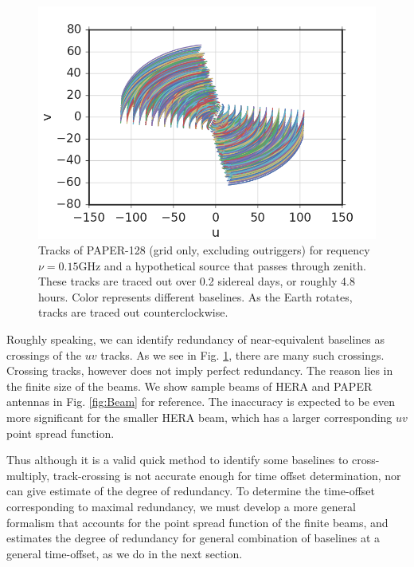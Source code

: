\documentclass[twocolumn,apj,numberedappendix]{emulateapj}
\renewcommand\[{\begin{equation}}
\renewcommand\]{\end{equation}}
\begin{document}
\begin{figure}[H]
\includegraphics[width=\linewidth]{tracks128}
\caption{Tracks of PAPER-128 (grid only, excluding outriggers) for requency $\nu=0.15\text{GHz}$ and a hypothetical source that passes through zenith.
These tracks are traced out over 0.2 sidereal days, or roughly 4.8
hours. Color represents different baselines. 
As the Earth rotates, tracks are traced out counterclockwise. }
\label{fig:Tracks}
\end{figure}

Roughly speaking, we can identify
redundancy of near-equivalent baselines as crossings
of the $uv$ tracks. As we see in Fig. \ref{fig:Tracks}, there are many such crossings. Crossing tracks, however does not imply perfect redundancy. The reason lies in the finite size of the beams. We show sample beams of HERA and PAPER antennas in Fig. \ref{fig:Beam} for reference. The inaccuracy is expected to be even more significant for the smaller HERA beam, which has a larger corresponding $uv$ point spread function. 

Thus although it is a valid quick method to identify some baselines to cross-multiply, track-crossing is
not accurate enough for time offset determination, nor can give estimate of the degree of redundancy. To determine the time-offset corresponding to maximal redundancy, we must develop a more general  formalism that accounts for the point spread function of the finite beams, and estimates the degree of redundancy for general combination of baselines at a general time-offset, as we do in the next section.  
\end{document}

